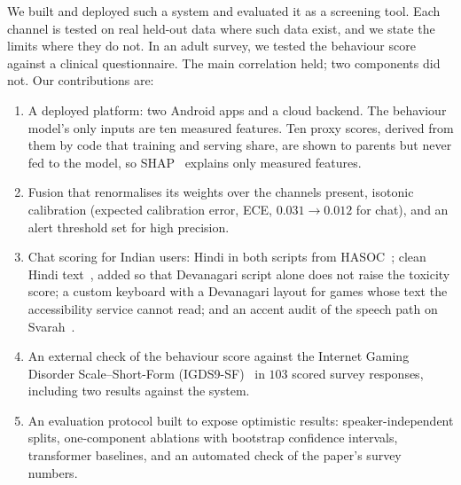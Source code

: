 \documentclass[conference]{IEEEtran}
\begin{document}
We built and deployed such a system and evaluated it as a screening tool. Each channel
is tested on real held-out data where such data exist, and we state the limits where
they do not. In an adult survey, we tested the behaviour score against a clinical
questionnaire. The main correlation held; two components did not. Our contributions are:
\begin{enumerate}
\item A deployed platform: two Android apps and a cloud backend. The behaviour model's
  only inputs are ten measured features. Ten proxy scores, derived from them by code
  that training and serving share, are shown to parents but never fed to the model, so
  SHAP~\cite{shap2017} explains only measured features.
\item Fusion that renormalises its weights over the channels present, isotonic
  calibration (expected calibration error, ECE, $0.031\!\rightarrow\!0.012$ for chat),
  and an alert threshold set for high precision.
\item Chat scoring for Indian users: Hindi in both scripts from
  HASOC~\cite{hasoc2019}; clean Hindi text~\cite{wikihi}, added so that Devanagari
  script alone does not raise the toxicity score; a custom keyboard with a Devanagari
  layout for games whose text the accessibility service cannot read; and an accent
  audit of the speech path on Svarah~\cite{svarah2023}.
\item An external check of the behaviour score against the Internet Gaming Disorder
  Scale--Short-Form (IGDS9-SF)~\cite{igds9sf} in $103$ scored survey responses,
  including two results against the system.
\item An evaluation protocol built to expose optimistic results: speaker-independent
  splits, one-component ablations with bootstrap confidence intervals, transformer
  baselines, and an automated check of the paper's survey numbers.
\end{enumerate}

\end{document}
